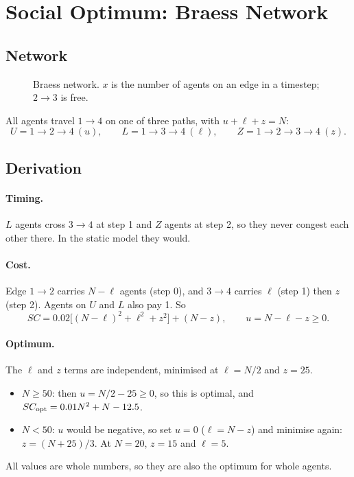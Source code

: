 \documentclass[11pt]{article}
\begin{document}
\section{Social Optimum: Braess Network}

\subsection{Network}

\begin{figure}[H]
  \centering
  
  \caption{Braess network. $x$ is the number of agents on an edge in a timestep; $2 \to 3$ is free.}
\end{figure}

All agents travel $1 \to 4$ on one of three paths, with $u + \ell + z = N$:
\[
  U = 1 \to 2 \to 4 \ (u), \qquad L = 1 \to 3 \to 4 \ (\ell), \qquad Z = 1 \to 2 \to 3 \to 4 \ (z).
\]

\subsection{Derivation}

\paragraph{Timing.} $L$ agents cross $3 \to 4$ at step 1 and $Z$ agents at step 2, so they never congest
each other there. In the static model they would.

\paragraph{Cost.} Edge $1 \to 2$ carries $N - \ell$ agents (step 0), and $3 \to 4$ carries $\ell$ (step 1)
then $z$ (step 2). Agents on $U$ and $L$ also pay 1. So
\[
  SC = 0.02\bigl[(N - \ell)^2 + \ell^2 + z^2\bigr] + (N - z), \qquad u = N - \ell - z \ge 0 .
\]

\paragraph{Optimum.} The $\ell$ and $z$ terms are independent, minimised at $\ell = N/2$ and $z = 25$.
\begin{itemize}
  \item $N \ge 50$: then $u = N/2 - 25 \ge 0$, so this is optimal, and $SC_{\mathrm{opt}} = 0.01N^2 + N - 12.5$.
  \item $N < 50$: $u$ would be negative, so set $u = 0$ ($\ell = N - z$) and minimise again:
        $z = (N + 25)/3$. At $N = 20$, $z = 15$ and $\ell = 5$.
\end{itemize}
All values are whole numbers, so they are also the optimum for whole agents.
\end{document}
